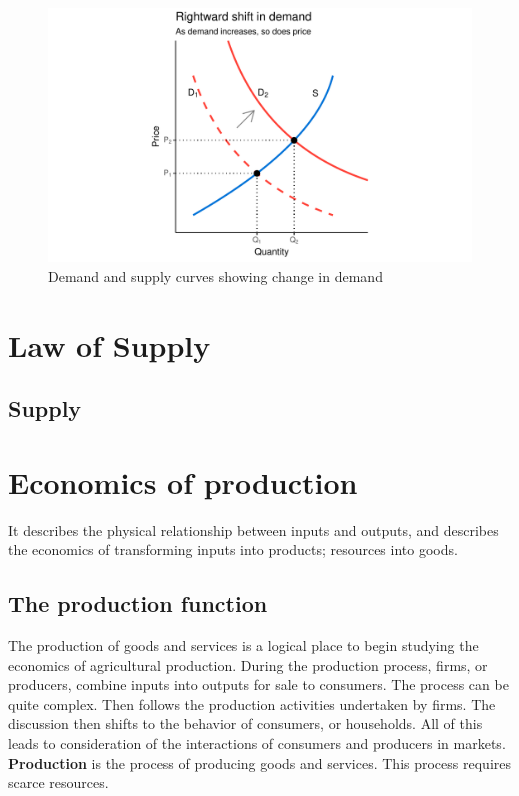 \documentclass[11pt,]{book}
\theoremstyle{definition}
\theoremstyle{definition}
\theoremstyle{definition}
\theoremstyle{remark}
\begin{document}
\begin{figure}

{\centering \includegraphics[width=1.05\linewidth]{Farm_Management_and_Economics_files/figure-latex/demand-curve1-1} 

}

\caption{Demand and supply curves showing change in demand}\label{fig:demand-curve1}
\end{figure}

\section{Law of Supply}\label{law-of-supply}

\subsection{Supply}\label{supply}

\section{Economics of production}\label{economics-of-production}

It describes the physical relationship between inputs and outputs, and
describes the economics of transforming inputs into products; resources
into goods.

\subsection{The production function}\label{the-production-function}

The production of goods and services is a logical place to begin
studying the economics of agricultural production. During the production
process, firms, or producers, combine inputs into outputs for sale to
consumers. The process can be quite complex. Then follows the production
activities undertaken by firms. The discussion then shifts to the
behavior of consumers, or households. All of this leads to consideration
of the interactions of consumers and producers in markets.
\textbf{Production} is the process of producing goods and services. This
process requires scarce resources.
\end{document}
